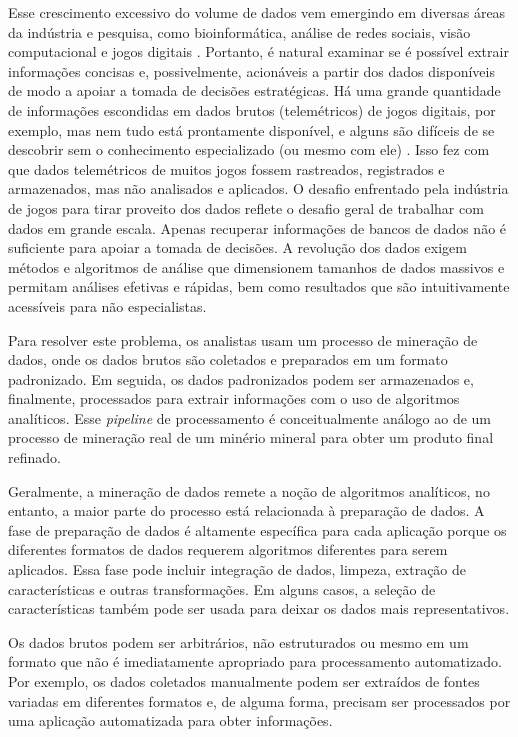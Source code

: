 Esse crescimento excessivo do volume de dados vem emergindo em diversas áreas da indústria e pesquisa, como bioinformática, análise de redes sociais, visão computacional e jogos digitais \cite{el2016game}. Portanto, é natural examinar se é possível extrair informações concisas e, possivelmente, acionáveis a partir dos dados disponíveis de modo a apoiar a tomada de decisões estratégicas. Há uma grande quantidade de informações escondidas em dados brutos (telemétricos) de jogos digitais, por exemplo, mas nem tudo está prontamente disponível, e alguns são difíceis de se descobrir sem o conhecimento especializado (ou mesmo com ele) \cite{el2016game}. Isso fez com que dados telemétricos de muitos jogos fossem rastreados, registrados e armazenados, mas não analisados e aplicados. O desafio enfrentado pela indústria de jogos para tirar proveito dos dados reflete o desafio geral de trabalhar com dados em grande escala. Apenas recuperar informações de bancos de dados não é suficiente para apoiar a tomada de decisões. A revolução dos dados exigem métodos e algoritmos de análise que dimensionem tamanhos de dados massivos e permitam análises efetivas e rápidas, bem como resultados que são intuitivamente acessíveis para não especialistas.

Para resolver este problema, os analistas usam um processo de mineração de dados, onde os dados brutos são coletados e preparados em um formato padronizado. Em seguida, os dados padronizados podem ser armazenados e, finalmente, processados para extrair informações com o uso de algoritmos analíticos. Esse \textit{pipeline} de processamento é conceitualmente análogo ao de um processo de mineração real de um minério mineral para obter um produto final refinado.

Geralmente, a mineração de dados remete a noção de algoritmos analíticos, no entanto, a maior parte do processo está relacionada à preparação de dados. A fase de preparação de dados é altamente específica para cada aplicação porque os diferentes formatos de dados requerem algoritmos diferentes para serem aplicados. Essa fase pode incluir integração de dados, limpeza, extração de características e outras transformações. Em alguns casos, a seleção de características também pode ser usada para deixar os dados mais representativos.

Os dados brutos podem ser arbitrários, não estruturados ou mesmo em um formato que não é imediatamente apropriado para processamento automatizado. Por exemplo, os dados coletados manualmente podem ser extraídos de fontes variadas em diferentes formatos e, de alguma forma, precisam ser processados por uma aplicação automatizada para obter informações.

